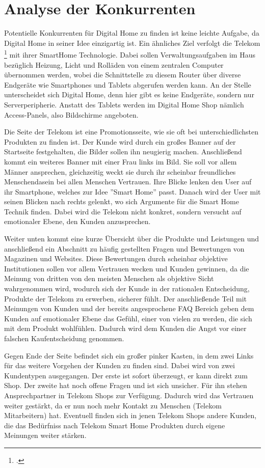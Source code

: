 \section{Analyse der Konkurrenten}
Potentielle Konkurrenten für Digital Home zu finden ist keine leichte Aufgabe, da Digital Home in seiner Idee einzigartig ist. Ein ähnliches Ziel verfolgt die Telekom \footcite[Website der Telekom:][]{Tkom} mit ihrer SmartHome Technologie. Dabei sollen Verwaltungsaufgaben im Haus bezüglich Heizung, Licht und Rolläden von einem zentralen Computer übernommen werden, wobei die Schnittstelle zu diesem Router über diverse Endgeräte wie Smartphones und Tablets abgerufen werden kann. An der Stelle unterscheidet sich Digital Home, denn hier gibt es keine Endgeräte, sondern nur Serverperipherie. Anstatt des Tablets werden im Digital Home Shop nämlich Access-Panels, also Bildschirme angeboten.

Die Seite der Telekom ist eine Promotionsseite, wie sie oft bei unterschiedlichsten Produkten zu finden ist. Der Kunde wird durch ein großes Banner auf der Startseite festgehalten, die Bilder sollen ihn neugierig machen. Anschließend kommt ein weiteres Banner mit einer Frau links im Bild. Sie soll vor allem Männer ansprechen, gleichzeitig weckt sie durch ihr scheinbar freundliches Menschendasein bei allen Menschen Vertrauen. Ihre Blicke lenken den User auf ihr Smartphone, welches zur Idee ''Smart Home'' passt. Danach wird der User mit seinen Blicken nach rechts gelenkt, wo sich Argumente für die Smart Home Technik finden. Dabei wird die Telekom nicht konkret, sondern versucht auf emotionaler Ebene, den Kunden anzusprechen.

Weiter unten kommt eine kurze Übersicht über die Produkte und Leistungen und anschließend ein Abschnitt zu häufig gestellten Fragen und Bewertungen von Magazinen und Websites. Diese Bewertungen durch scheinbar objektive Institutionen sollen vor allem Vertrauen wecken und Kunden gewinnen, da die Meinung von dritten von den meisten Menschen als objektive Sicht wahrgenommen wird, wodurch sich der Kunde in der rationalen Entscheidung, Produkte der Telekom zu erwerben, sicherer fühlt. Der anschließende Teil mit Meinungen von Kunden und der bereits angesprochene FAQ Bereich geben dem Kunden auf emotionaler Ebene das Gefühl, einer von vielen zu werden, die sich mit dem Produkt wohlfühlen. Dadurch wird dem Kunden die Angst vor einer falschen Kaufentscheidung genommen.

Gegen Ende der Seite befindet sich ein großer pinker Kasten, in dem zwei Links für das weitere Vorgehen der Kunden zu finden sind. Dabei wird von zwei Kundentypen ausgegangen. Der erste ist sofort überzeugt, er kann direkt zum Shop. Der zweite hat noch offene Fragen und ist sich unsicher. Für ihn stehen Ansprechpartner in Telekom Shops zur Verfügung. Dadurch wird das Vertrauen weiter gestärkt, da er nun noch mehr Kontakt zu Menschen (Telekom Mitarbeitern) hat. Eventuell finden sich in jenen Telekom Shops andere Kunden, die das Bedürfniss nach Telekom Smart Home Produkten durch eigene Meinungen weiter stärken.

